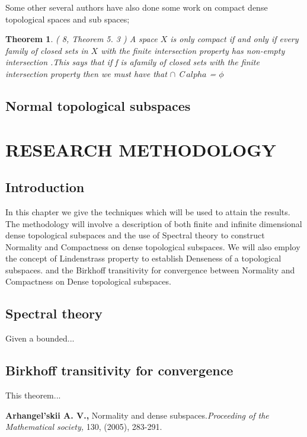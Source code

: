 \documentclass[PhD,14,a4paper]{report}
\theoremstyle{plain}
\newtheorem{thm}{Theorem}[section]
\theoremstyle{definition}
\theoremstyle{remark}
\numberwithin{figure}{section}
\numberwithin{equation}{subsection}
\begin{document}
{Some other several authors have also done some work on compact dense topological spaces and sub spaces;


\begin{thm}
( 8, Theorem 5. 3 ) A space $X$ is only compact if and only if every family of closed sets in $X$ with the finite intersection property has non-empty intersection .This says that if f is afamily of closed sets with the finite intersection property then we must have that $\cap$ C$\ alpha$  = $\phi$
\end{thm}

\section{Normal topological subspaces}



\chapter{RESEARCH METHODOLOGY}
\section{Introduction}
\noindent In this chapter we give the techniques which will be used to attain the results. The methodology will involve  a description of  both finite and infinite dimensional dense topological subspaces and  the use of  Spectral theory to construct Normality and Compactness on dense topological subspaces. We will also employ the concept of Lindenstrass property to establish Denseness of a topological subspaces. and the Birkhoff transitivity for convergence between Normality and Compactness on Dense topological subspaces.

\section{Spectral theory}
\noindent Given a bounded...
\section{Birkhoff transitivity for convergence}
\noindent   This theorem...
\newpage
\nocite{*}
 \noindent
\begin{thebibliography}{12}
\label{Arh1}
\textbf{ Arhangel'skii A. V.,} Normality and dense subspaces.\textit{Proceeding of the Mathematical society,} 130, (2005), 283-291.


\end{thebibliography}}
\end{document}
